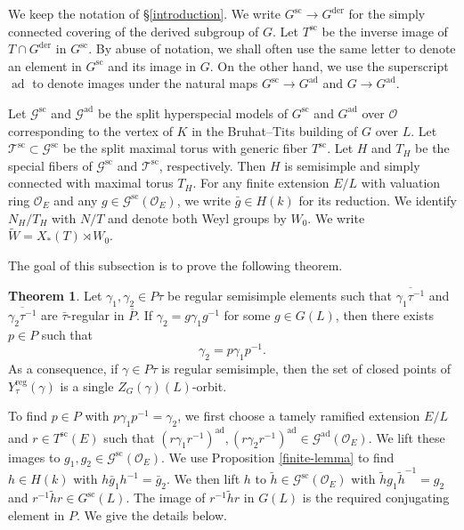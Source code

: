 \documentclass[12pt]{article}
\DeclareMathOperator{\ad}{ad}
\newcommand\cO{\mathcal O}
\newcommand\cG{\mathcal G}
\newcommand\tW{\tilde W}
\theoremstyle{definition}
\newtheorem{theo}{Theorem}[section]
\newcommand{\scs}{\mathrm{sc}}
\newcommand{\der}{\mathrm{der}}
\newcommand{\reg}{\mathrm{reg}}
\begin{document}
We keep the notation of \S\ref{introduction}.
We write $G^{\scs}\longrightarrow G^{\der}$ for the simply connected covering of the derived subgroup of $G$.
Let $T^{\scs}$ be the inverse image of $T\cap G^{\der}$ in $G^{\scs}$.
By abuse of notation, we shall often use the same letter to denote an element in $G^{\scs}$ and its image in $G$.
On the other hand, we use the superscript $\ad$ to denote images under the natural maps $G^{\scs}\to G^{\ad}$ and $G\to G^{\ad}$.

Let $\cG^{\scs}$ and $\cG^{\ad}$ be the split hyperspecial models of $G^{\scs}$ and $G^{\ad}$ over $\cO$ corresponding to the vertex of $K$ in the Bruhat--Tits building of $G$ over $L$.
Let $\mathcal T^{\scs}\subset\cG^{\scs}$ be the split maximal torus with generic fiber $T^{\scs}$.
Let $H$ and $T_H$ be the special fibers of $\cG^{\scs}$ and $\mathcal T^{\scs}$, respectively.
Then $H$ is semisimple and simply connected with maximal torus $T_H$.
For any finite extension $E/L$ with valuation ring $\cO_E$ and any $g\in \cG^{\scs}(\cO_E)$, we write $\bar g\in H(k)$ for its reduction.
We identify $N_H/T_H$ with $N/T$ and denote both Weyl groups by $W_0$.
We write $\tW=X_*(T)\rtimes W_0$.

The goal of this subsection is to prove the following theorem.

\begin{theo}\label{parahoric-conjugacy}
Let $\gamma_1,\gamma_2\in P\tau$ be regular semisimple elements such that $\overline{\gamma_1\tau^{-1}}$ and $\overline{\gamma_2\tau^{-1}}$ are $\bar\tau$-regular in $\overline P$.
If $\gamma_2=g\gamma_1g^{-1}$ for some $g\in G(L)$, then there exists $p\in P$ such that
$$
\gamma_2=p\gamma_1p^{-1}.
$$
As a consequence, if $\gamma\in P\tau$ is regular semisimple, then the set of closed points of $Y_\tau^{\reg}(\gamma)$ is a single $Z_G(\gamma)(L)$-orbit.
\end{theo}

To find $p\in P$ with $p\gamma_1p^{-1}=\gamma_2$, we first choose a tamely ramified extension $E/L$ and $r\in T^{\scs}(E)$ such that $(r\gamma_1r^{-1})^{\ad},(r\gamma_2r^{-1})^{\ad}\in \cG^{\ad}(\cO_E)$.
We lift these images to $g_1,g_2\in \cG^{\scs}(\cO_E)$.
We use Proposition \ref{finite-lemma} to find $h\in H(k)$ with $h\bar g_1h^{-1}=\bar g_2$.
We then lift $h$ to $\widetilde h\in \cG^{\scs}(\cO_E)$ with $\widetilde h g_1\widetilde h^{-1}=g_2$ and $r^{-1}\widetilde h r\in G^{\scs}(L)$.
The image of $r^{-1}\widetilde h r$ in $G(L)$ is the required conjugating element in $P$.
We give the details below.
\end{document}
